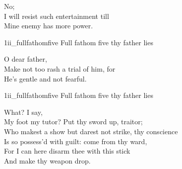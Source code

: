 \begin{verse_speech}[Ferdinand] 
No;\\
I will resist such entertainment till\\
Mine enemy has more power.
\end{verse_speech}



\begin{pictures} %
	\begin{letter}
		\begin{colorbigpic}
			[1.1]
			{1ii_fullfathomfive}
			{Full fathom five thy father lies}
		\end{colorbigpic}
	\end{letter}
\end{pictures}
	





\begin{verse_speech}[Miranda] 
O dear father,\\
Make not too rash a trial of him, for\\
He's gentle and not fearful.
\end{verse_speech}


\begin{pictures} %
	\begin{a4}
		\begin{colorbigpic}
			[1.0]
			{1ii_fullfathomfive}
			{Full fathom five thy father lies}
		\end{colorbigpic}
	\end{a4}
\end{pictures}
	


\begin{verse_speech}[Prospero] 
What? I say,\\
My foot my tutor? Put thy sword up, traitor;\\
Who makest a show but darest not strike, thy conscience\\
Is so possess'd with guilt: come from thy ward,\\
For I can here disarm thee with this stick\\
And make thy weapon drop.
\end{verse_speech}

